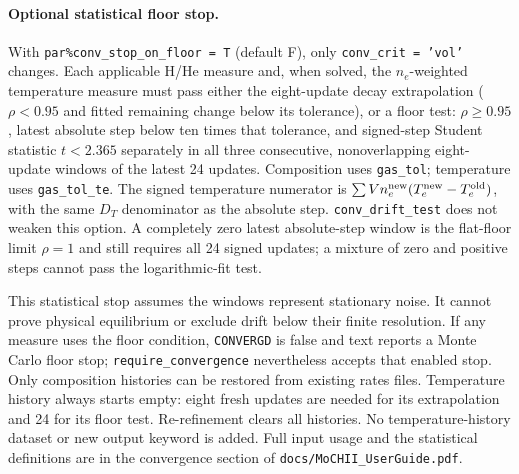 \documentclass[english,a4paper]{my_memo}
\newcommand{\code}[1]{\texttt{#1}}
\begin{document}
\paragraph{Optional statistical floor stop.}
With \code{par\%conv\_stop\_on\_floor = T} (default F), only
\code{conv\_crit = 'vol'} changes.  Each applicable H/He measure and,
when solved, the $n_e$-weighted temperature measure must pass either
the eight-update decay extrapolation ($\rho<0.95$ and fitted remaining
change below its tolerance), or a floor test: $\rho\ge0.95$, latest
absolute step below ten times that tolerance, and signed-step
Student statistic $t<2.365$ separately in all three consecutive,
nonoverlapping eight-update windows of the latest 24 updates.
Composition uses \code{gas\_tol}; temperature uses \code{gas\_tol\_te}.
The signed temperature numerator is
$\sum Vn_e^{\rm new}(T_e^{\rm new}-T_e^{\rm old})$, with the same
$D_T$ denominator as the absolute step.  \code{conv\_drift\_test} does not weaken this option.
A completely zero latest absolute-step window is the flat-floor limit
$\rho=1$ and still requires all 24 signed updates; a mixture of zero
and positive steps cannot pass the logarithmic-fit test.

This statistical stop assumes the windows represent stationary noise.
It cannot prove physical equilibrium or exclude drift below their
finite resolution.  If any measure uses the floor condition,
\code{CONVERGD} is false and text reports a Monte Carlo floor stop;
\code{require\_convergence} nevertheless accepts that enabled stop.
Only composition histories can be restored from existing rates files.
Temperature history always starts empty: eight fresh updates are needed
for its extrapolation and 24 for its floor test.  Re-refinement clears
all histories.  No temperature-history dataset or new output keyword
is added.  Full input usage and the statistical definitions are in the
convergence section of \code{docs/MoCHII\_UserGuide.pdf}.
\end{document}
